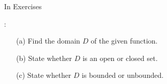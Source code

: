 {\noindent In Exercises}
{: 
\begin{enumerate}
\item	[(a)] Find the domain $D$ of the given function.
\item	[(b)] State whether $D$ is an open or closed set.
\item [(c)] State whether $D$ is bounded or unbounded.
\end{enumerate}}

